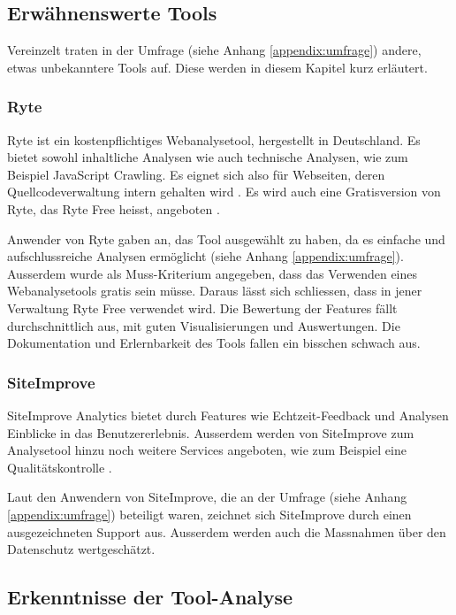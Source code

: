 \newpage

\subsection{Erwähnenswerte Tools}

Vereinzelt traten in der Umfrage (siehe Anhang \ref{appendix:umfrage}) andere, etwas unbekanntere Tools auf. Diese werden in diesem Kapitel kurz erläutert. 

\subsubsection{Ryte}

Ryte ist ein kostenpflichtiges Webanalysetool, hergestellt in Deutschland. Es bietet sowohl inhaltliche Analysen wie auch technische Analysen, wie zum Beispiel JavaScript Crawling. Es eignet sich also für Webseiten, deren Quellcodeverwaltung intern gehalten wird \parencite{RyteFeatures}. Es wird auch eine Gratisversion von Ryte, das Ryte Free heisst, angeboten \parencite{RyteFree}.

Anwender von Ryte gaben an, das Tool ausgewählt zu haben, da es einfache und aufschlussreiche Analysen ermöglicht (siehe Anhang \ref{appendix:umfrage}). Ausserdem wurde als Muss-Kriterium angegeben, dass das Verwenden eines Webanalysetools gratis sein müsse. Daraus lässt sich schliessen, dass in jener Verwaltung Ryte Free verwendet wird. Die Bewertung der Features fällt durchschnittlich aus, mit guten Visualisierungen und Auswertungen. Die Dokumentation und Erlernbarkeit des Tools fallen ein bisschen schwach aus. 

\subsubsection{SiteImprove}

SiteImprove Analytics bietet durch Features wie Echtzeit-Feedback und Analysen Einblicke in das Benutzererlebnis. Ausserdem werden von SiteImprove zum Analysetool hinzu noch weitere Services angeboten, wie zum Beispiel eine Qualitätskontrolle \parencite{SiteimproveFeatures}.

Laut den Anwendern von SiteImprove, die an der Umfrage (siehe Anhang \ref{appendix:umfrage}) beteiligt waren, zeichnet sich SiteImprove durch einen ausgezeichneten Support aus. Ausserdem werden auch die Massnahmen über den Datenschutz wertgeschätzt.


\subsection{Erkenntnisse der Tool-Analyse}

